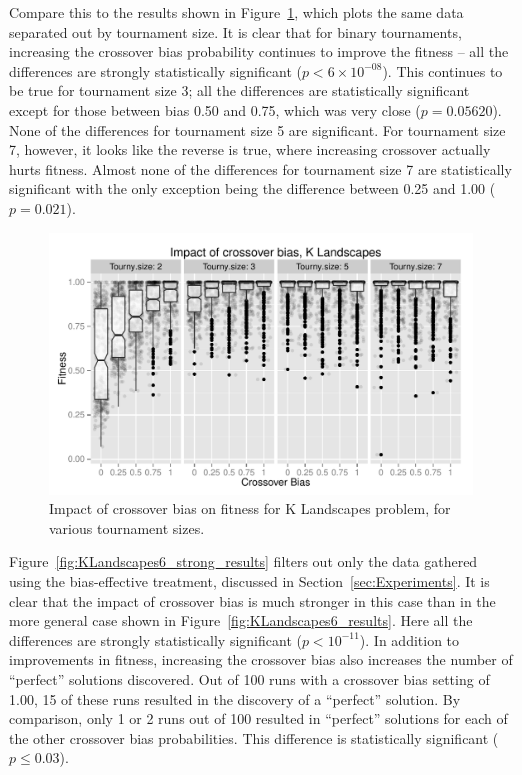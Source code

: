 \documentclass{sig-alternate}
\begin{document}
Compare this to the results shown in Figure~\ref{fig:KLandscapes6_XO_bias_impact_facets}, which plots the same data
separated out by tournament size. It is clear that for binary tournaments, increasing the crossover bias probability
continues to improve the fitness -- all the differences are strongly statistically significant ($p<6\times 10^{-08}$).
This continues to be true for tournament size 3; all the differences are statistically significant except for those
between bias 0.50 and 0.75, which was very close ($p=0.05620$). None of the differences for tournament size 5 are
significant. For tournament size 7, however, it looks like the reverse is true, where increasing crossover actually
hurts fitness. Almost none of the differences for tournament size 7 are statistically significant with the only
exception being the difference between 0.25 and 1.00 ($p=0.021$).

\begin{figure}
\centering
\includegraphics[width=0.45 \textwidth]{Plots/KLandscapes6_XO_bias_impact_facets.pdf}
\caption{Impact of crossover bias on fitness for K Landscapes problem, for various tournament sizes.}
\label{fig:KLandscapes6_XO_bias_impact_facets}
\end{figure}

Figure~\ref{fig:KLandscapes6_strong_results} filters out only the data gathered using the bias-effective treatment,
discussed in Section~\ref{sec:Experiments}. It is clear that the impact of crossover bias is much stronger in this case
than in the more general case shown in Figure~\ref{fig:KLandscapes6_results}. Here all the differences are strongly
statistically significant ($p < 10^{-11}$). In addition to improvements in fitness, increasing the crossover bias also
increases the number of ``perfect'' solutions discovered. Out of 100 runs with a crossover bias setting of 1.00, 15 of
these runs resulted in the discovery of a ``perfect'' solution. By comparison, only 1 or 2 runs out of 100 resulted in
``perfect'' solutions for each of the other crossover bias probabilities. This difference is statistically significant
($p \leq 0.03$).
\end{document}
